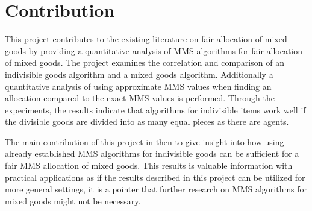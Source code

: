 \chapter{Contribution}\label{chp:contribution}


This project contributes to the existing literature on fair allocation of mixed goods by providing a quantitative analysis of MMS algorithms for fair allocation of mixed goods. The project examines the correlation and comparison of an indivisible goods algorithm and a mixed goods algorithm. Additionally a quantitative analysis of using approximate MMS values when finding an allocation compared to the exact MMS values is performed. Through the experiments, the results indicate that algorithms for indivisible items work well if the divisible goods are divided into as many equal pieces as there are agents.

The main contribution of this project in then to give insight into how using already established MMS algorithms for indivisible goods can be sufficient for a fair MMS allocation of mixed goods. This results is valuable information with practical applications as if the results described in this project can be utilized for more general settings, it is a pointer that further research on MMS algorithms for mixed goods might not be necessary.